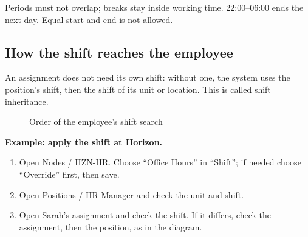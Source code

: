 \begin{rcnote}
Periods must not overlap; breaks stay inside working time. 22:00–06:00 ends the next day. Equal start and end is not allowed.
\end{rcnote}

\subsection{How the shift reaches the employee}
\label{sec:hr-shift-inheritance}

An assignment does not need its own shift: without one, the system uses the position's shift, then the shift of its unit or location. This is called shift inheritance.

\begin{figure}[H]
\centering
{}
\rclegend
\caption{Order of the employee's shift search}
\label{fig:hr-shift-order}
\end{figure}


\textbf{Example: apply the shift at Horizon.}

\begin{enumerate}
  \item Open Nodes / HZN-HR. Choose “Office Hours” in “Shift”; if needed choose “Override” first, then save.
  \item Open Positions / HR Manager and check the unit and shift.
  \item Open Sarah's assignment and check the shift. If it differs, check the assignment, then the position, as in the diagram.
\end{enumerate}

